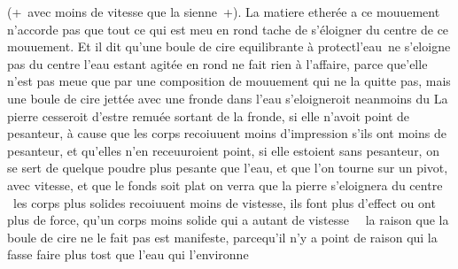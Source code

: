 (+~avec moins de vitesse que la sienne~+).
La matiere ether\'{e}e a ce mouuement
n'accorde pas que tout ce qui est meu en rond tache de s'\'{e}loigner du centre de ce mouuement.
Et il dit qu'une boule de cire\protect{} equilibrante \`{a} protectl'eau\,
ne s'eloigne pas du centre l'eau\protect{} estant agit\'{e}e en rond
ne fait rien \`{a} l'affaire, parce que'elle n'est pas meue que par une composition de mouuement qui ne la quitte pas,
mais une boule de cire\protect{} jett\'{e}e avec une fronde\protect{}
dans l'eau s'eloigneroit neanmoins du
La pierre cesseroit d'estre remu\'{e}e sortant de la \protect{}fronde,
si elle n'avoit point de pesanteur,\protect{} \`{a} cause que les corps recoiuuent moins d'impression s'ils ont moins de pesanteur,\protect{} et qu'elles n'en receuuroient point,
si elle estoient sans pesanteur,\protect{}
 on se sert de quelque poudre\protect{} plus pesante que l'eau\protect{}, et que l'on tourne sur un pivot, avec vitesse, et que le fonds soit plat
on verra que la pierre s'eloignera du centre%
%
~les corps plus solides recoiuuent moins de vistesse,
ils font plus d'effect ou ont plus de force, qu'un corps moins solide qui a autant de vistesse~%
%
~la raison que la boule de cire\protect{} ne le fait pas est manifeste,
parcequ'il n'y a point de raison qui la fasse faire plus tost que l'eau\protect{} qui l'environne~%
%
